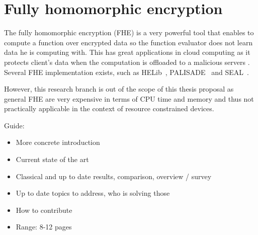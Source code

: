 \documentclass[
  digital, %
  twoside, %
  table,   %
  lof,     %
  lot,     %
]{fithesis3}
\theoremstyle{definition}
\theoremstyle{remark}
\begin{document}
\section{Fully homomorphic encryption}\label{sec:soa:fhe}
The fully homomorphic encryption (FHE) is a very powerful tool that enables to compute a function over encrypted data so the function evaluator does not learn data he is computing with. This has great applications in cloud computing as it protects client's data when the computation is offloaded to a malicious servers \cite{Gentry:2009:FHE:1536414.1536440, 10.1007/978-3-642-13190-5_2, cryptoeprint:2011:133, cryptoeprint:2012:099, 10.1007/978-3-642-40041-4_5, 10.1007/978-3-642-36362-7_1, 10.1007/978-3-642-55220-5_30}. 
Several FHE implementation exists, such as HELib~\cite{helib}, PALISADE~\cite{palisade} and SEAL~\cite{seal}.

However, this research branch is out of the scope of this thesis proposal as general FHE are very expensive in terms of CPU time and memory and thus not practically applicable in the context of resource constrained devices.


\newpage
\begin{shaded}
	Guide:
	\begin{itemize}
		\item More concrete introduction
		\item Current state of the art
		\item Classical and up to date results, comparison, overview / survey
		\item Up to date topics to address, who is solving those
		\item How to contribute
		\item Range: 8-12 pages
	\end{itemize}
\end{shaded}
\end{document}
